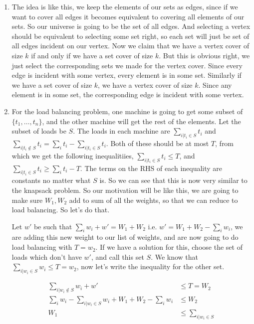 \documentclass[12pt]{report}
\begin{document}
\begin{enumerate}[label=\textbf{\arabic*.}]
    \item The idea is like this, we keep the elements of our sets as edges, since if we want to cover all edges it becomes equivalent to
    covering all elements of our sets. So our universe is going to be the set of all edges.
    And selecting a vertex should be equivalent to selecting some set right, so each set will just be set of all edges incident on our vertex.
    Now we claim that we have a vertex cover of size $k$ if and only if we have a set cover of size $k$. But this is obvious right, we just 
    select the corresponding sets we made for the vertex cover. Since every edge is incident with some vertex, every element is in some set.
    Similarly if we have a set cover of size $k$, we have a vertex cover of size $k$. Since any element is in some set, the corresponding edge 
    is incident with some vertex.

    \item For the load balancing problem, one machine is going to get some subset of $\{t_1, \dots, t_n\}$, and the other machine will get
    the rest of the elements. Let the subset of loads be $S$. The loads in each machine are $\sum_{i|t_i \in S} t_i$ and 
    $\sum_{i|t_i \notin S} t_i = \sum_i t_i - \sum_{i|t_i \in S} t_i$. Both of these should be at most $T$, from which we get the following 
    inequalitiies, $\sum_{i|t_i \in S} t_i \leq T$, and $\sum_{i|t_i \in S} t_i \geq \sum_i t_i - T$. The terms on the RHS of each inequality are 
    constants no matter what $S$ is. So we can see that this is now very similar to the knapsack problem. So our motivation will be like this,
    we are going to make sure $W_1, W_2$ add to sum of all the weights, so that we can reduce to load balancing. So let's do that.

    Let $w'$ be such that $\sum_i w_i + w' = W_1 + W_2$ i.e. $w' = W_1 + W_2 - \sum_i w_i$, we are adding this new weight to our list of weights,
    and are now going to do load balancing with $T = w_2$. If we have a solution for this, choose the set of loads which don't have $w'$, and 
    call this set $S$. We know that $\sum_{i|w_i \in S} w_i \leq T = w_2$, now let's write the inequality for the other set.

    \begin{align*}
        \sum_{i|w_i \notin S} w_i + w' &\leq T = W_2 \\
        \sum_i w_i - \sum_{i|w_i \in S} w_i + W_1 + W_2 - \sum_i w_i &\leq W_2 \\
        W_1 &\leq \sum_{i|w_i \in S} 
    \end{align*}


\end{enumerate}
\end{document}
